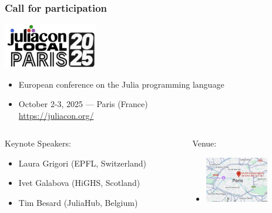 \documentclass[]{beamer}
\begin{document}
\begin{frame}
  \frametitle{Call for participation}
\vspace{3mm}



\hspace{-3mm}\includegraphics[height=1.95cm]{logoparis.png}     \vspace{2mm}\\
\begin{itemize}
\item[] \small{European conference on the Julia programming language}\vspace{-1mm}
\item[] October 2-3, 2025 --- Paris (France)\vspace{-1mm}\\
\smallskip
\url{https://juliacon.org/}
\end{itemize}    
          

\vspace{6mm}

    \begin{columns}
      \begin{column}{0.575\textwidth}
Keynote Speakers: \vspace{2mm}\\

\begin{itemize}
\item[] Laura Grigori (EPFL, Switzerland)\vspace{-1mm}

\item[] Ivet Galabova (HiGHS, Scotland)\vspace{-1mm}

\item[] Tim Besard (JuliaHub, Belgium)\vspace{-1mm}
\end{itemize}
\vspace{4mm}
      \end{column}
      \begin{column}{0.35\textwidth}
Venue:\vspace{2mm}\\
\begin{itemize}
\item[] \includegraphics[height=2.0cm]{localisationCNAM.png} 
\end{itemize}
      \end{column}
    \end{columns}






\end{frame}
\end{document}
